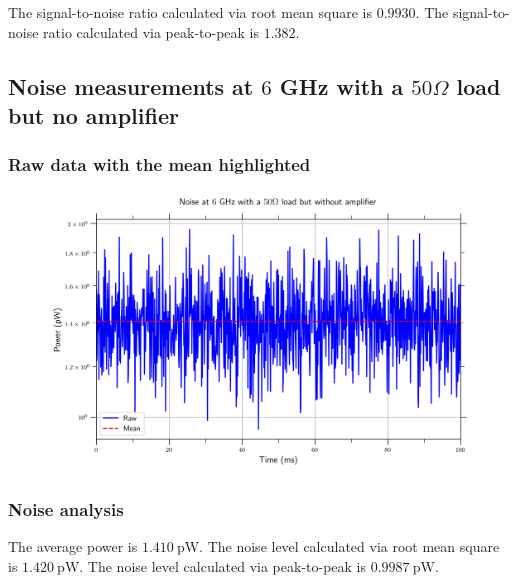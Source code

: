 \documentclass[english,12pt,a4paper]{article}
\begin{document}
	The signal-to-noise ratio calculated via root mean square is $0.9930$.
	The signal-to-noise ratio calculated via peak-to-peak is $1.382$.


\hypertarget{noise-measurements-at-6-ghz-with-a-50-omega-load-but-no-amplifier}{%
	\subsection{\texorpdfstring{Noise measurements at \(6\) GHz with a
			\(50 \Omega\) load but no
			amplifier}{Noise measurements at 6 GHz with a 50 \textbackslash Omega load but no amplifier}}\label{noise-measurements-at-6-ghz-with-a-50-omega-load-but-no-amplifier}}



\hypertarget{raw-data-with-the-mean-highlighted}{%
	\subsubsection{Raw data with the mean
		highlighted}\label{raw-data-with-the-mean-highlighted-6}}

\begin{figure}[H]
	\includegraphics[width=1\linewidth]{Plots/noise_floor_6_GHz_50ohm}
	\caption[Noise measurements at 6 GHz with a 50 Ohm load]{}
	\label{fig:noisefloor6ghz50ohm}
\end{figure}

 

\hypertarget{noise-analysis}{%
	\subsubsection{Noise analysis}\label{noise-analysis_2}}


	The average power is $\qty{1.410}{\pico\watt}$.
	The noise level calculated via root mean square is $\qty{1.420}{\pico\watt}$.
	The noise level calculated via peak-to-peak is $\qty{0.9987}{\pico\watt}$.
	
\end{document}
